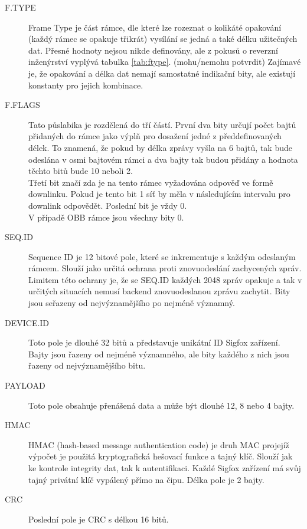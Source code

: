 \documentclass{ctuthesis}
\begin{document}
\begin{description}
\item[F.TYPE]
Frame Type je část rámce, dle které lze rozeznat o kolikáté opakování (každý rámec se opakuje třikrát) vysílání se jedná a také délku užitečných dat. Přesné hodnoty nejsou nikde definovány, ale z pokusů o reverzní inženýrství  \cite{sigfoxprotocol} vyplývá tabulka \ref{tab:ftype}. (mohu/nemohu potvrdit) Zajímavé je, že opakování a délka dat nemají samostatné indikační bity, ale existují konstanty pro jejich kombinace.
\item[F.FLAGS]
Tato půslabika je rozdělená do tří částí. První dva bity určují počet bajtů přidaných do rámce jako výplň pro dosažení jedné z předdefinovaných délek. To znamená, že pokud by délka zprávy vyšla na 6 bajtů, tak bude odeslána v osmi bajtovém rámci a dva bajty tak budou přidány a hodnota těchto bitů bude 10 neboli 2.\\
Třetí bit značí zda je na tento rámec vyžadována odpověď ve formě downlinku. Pokud je tento bit 1 síť by měla v následujícím intervalu pro downlink odpovědět. Poslední bit je vždy 0.\\
V případě OBB rámce jsou všechny bity 0.
\item[SEQ.ID]
Sequence ID je 12 bitové pole, které se inkrementuje s každým odeslaným rámcem. Slouží jako určitá ochrana proti znovuodeslání zachycených zpráv. Limitem této ochrany je, že se SEQ.ID každých 2048 zpráv opakuje a tak v určitých situacích nemusí backend znovuodeslanou zprávu zachytit. Bity jsou seřazeny od nejvýznamějšího po nejméně významný.
\item[DEVICE.ID]
Toto pole je dlouhé 32 bitů a představuje unikátní ID Sigfox zařízení. Bajty jsou řazeny od nejméně významného, ale bity každého z nich jsou řazeny od nejvýznamějšího bitu.
\item[PAYLOAD]
Toto pole obsahuje přenášená data a může být dlouhé 12, 8 nebo 4 bajty.
\item[HMAC]
HMAC (hash-based message authentication code) je druh MAC projejíž výpočet je použitá kryptografická hešovací funkce a tajný klíč. Slouží jak ke kontrole integrity dat, tak k autentifikaci. Každé Sigfox zařízení má svůj tajný privátní klíč vypálený přímo na čipu. Délka pole je 2 bajty.
\item[CRC]
Poslední pole je CRC s délkou 16 bitů.
\end{description}
\end{document}
